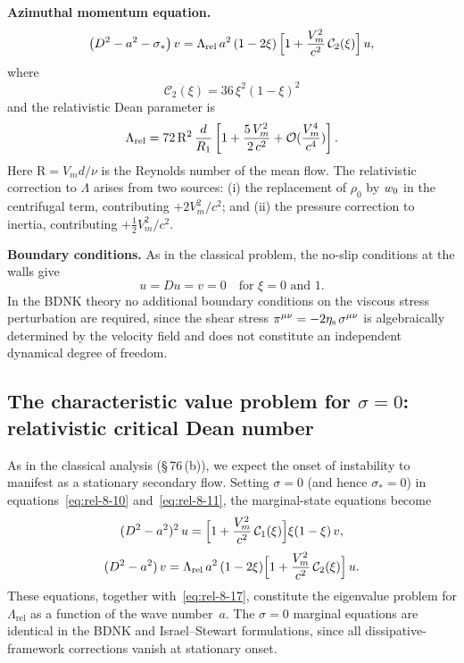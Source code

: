 \medskip
\noindent\textbf{Azimuthal momentum equation.}
\begin{equation}
\label{eq:rel-8-11}
\bigl(D^2 - a^2 - \sigma_*\bigr)\,v
= \Lambda_{\mathrm{rel}}\, a^2\, (1 - 2\xi)\,
  \Bigl[1 + \frac{V_m^2}{c^2}\,\mathcal{C}_2(\xi)\Bigr]\, u,
\end{equation}
where
\begin{equation}
\label{eq:rel-8-C2}
\mathcal{C}_2(\xi) = 36\,\xi^2(1-\xi)^2
\end{equation}
and the relativistic Dean parameter is
\begin{equation}
\label{eq:rel-8-Lambda}
\Lambda_{\mathrm{rel}}
  = 72\,\mathrm{R}^2\,\frac{d}{R_1}
  \left[1 + \frac{5\,V_m^2}{2\,c^2}
    + \mathcal{O}(\frac{V_m^4}{c^4})\right].
\end{equation}
Here $\mathrm{R} = V_m d/\nu$ is the Reynolds number of the mean flow.
The relativistic correction to $\Lambda$ arises from two sources:
(i) the replacement of $\rho_0$ by $w_0$ in the centrifugal
term, contributing $+2V_m^2/c^2$; and (ii) the pressure correction to
inertia, contributing $+\tfrac{1}{2}V_m^2/c^2$.

\medskip
\noindent\textbf{Boundary conditions.}
As in the classical problem, the no-slip conditions at the walls give
\begin{equation}
\label{eq:rel-8-17}
u = Du = v = 0 \quad \text{for } \xi = 0 \text{ and } 1.
\end{equation}
In the BDNK theory no additional boundary conditions on the viscous
stress perturbation are required, since the shear stress
$\pi^{\mu\nu} = -2\eta_{\mathrm{s}}\,\sigma^{\mu\nu}$ is algebraically
determined by the velocity field and does not constitute an independent
dynamical degree of freedom.

\subsection{The characteristic value problem for $\sigma = 0$:
  relativistic critical Dean number}
\label{sec:rel-76b}

As in the classical analysis (\S\,76\,(b)), we expect the onset of
instability to manifest as a stationary secondary flow.  Setting
$\sigma = 0$ (and hence $\sigma_* = 0$) in
equations~\eqref{eq:rel-8-10} and~\eqref{eq:rel-8-11},
the marginal-state equations become
\begin{equation}
\label{eq:rel-8-18}
(D^2 - a^2)^2\,u
  = \Bigl[1 + \frac{V_m^2}{c^2}\,\mathcal{C}_1(\xi)\Bigr]
    \xi(1-\xi)\, v,
\end{equation}
\begin{equation}
\label{eq:rel-8-19}
(D^2 - a^2)\,v = \Lambda_{\mathrm{rel}}\, a^2\,(1-2\xi)
  \Bigl[1 + \frac{V_m^2}{c^2}\,\mathcal{C}_2(\xi)\Bigr]\, u.
\end{equation}
These equations, together with~\eqref{eq:rel-8-17}, constitute the
eigenvalue problem for $\Lambda_{\mathrm{rel}}$ as a function of the
wave number~$a$.  The $\sigma = 0$ marginal equations are identical
in the BDNK and Israel--Stewart formulations, since all
dissipative-framework corrections vanish at stationary onset.

